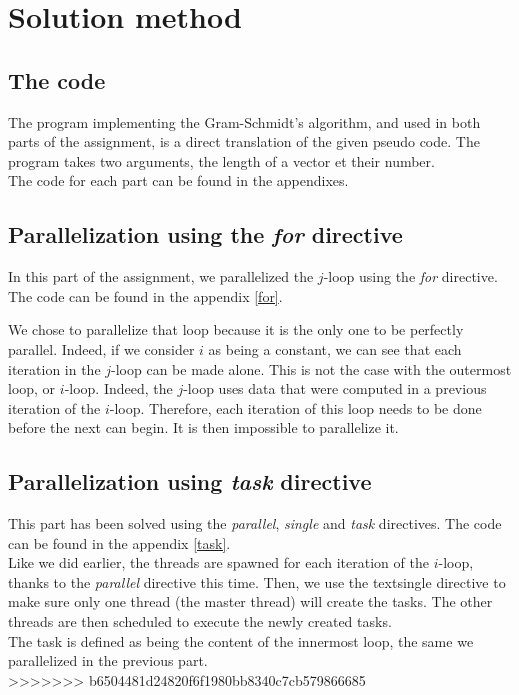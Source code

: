 \chapter{Solution method}

\section{The code}

The program implementing the Gram-Schmidt's algorithm, and used in both parts of the assignment, is a direct translation of the given pseudo code. The program takes two arguments, the length of a vector et their number.\\

The code for each part can be found in the appendixes.

\section{Parallelization using the \textit{for} directive}

In this part of the assignment, we parallelized the $j$-loop using the \textit{for} directive. The code can be found in the appendix \ref{for}.



We chose to parallelize that loop because it is the only one to be perfectly parallel. Indeed, if we consider $i$ as being a constant, we can see that each iteration in the $j$-loop can be made alone. This is not the case with the outermost loop, or $i$-loop. Indeed, the $j$-loop uses data that were computed in a previous iteration of the $i$-loop. Therefore, each iteration of this loop needs to be done before the next can begin. It is then impossible to parallelize it.\\ 

\section{Parallelization using \textit{task} directive}

This part has been solved using the \textit{parallel}, \textit{single} and \textit{task} directives. The code can be found in the appendix \ref{task}.\\

Like we did earlier, the threads are spawned for each iteration of the $i$-loop, thanks to the \textit{parallel} directive this time. Then, we use the text{single} directive to make sure only one thread (the master thread) will create the tasks. The other threads are then scheduled to execute the newly created tasks.\\ 

The task is defined as being the content of the innermost loop, the same we parallelized in the previous part. \\
>>>>>>> b6504481d24820f6f1980bb8340c7cb579866685
